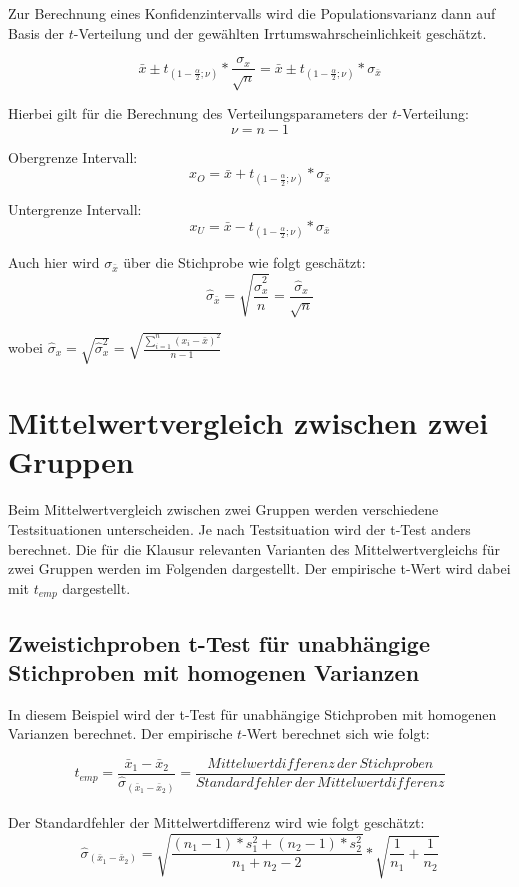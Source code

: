 \documentclass[11pt,a4paper]{article}
\begin{document}
Zur Berechnung eines Konfidenzintervalls wird die Populationsvarianz  dann auf Basis der $t$-Verteilung und der gewählten Irrtumswahrscheinlichkeit geschätzt.
 
$$\bar{x} \pm t_{(1-\frac{\alpha}{2}; \nu)} \ast \frac {\sigma_{x}}{\sqrt{n}} = \bar{x} \pm t_{(1 - \frac{\alpha}{2}; \nu)} * \sigma_{\bar{x}}$$

Hierbei gilt für die Berechnung des Verteilungsparameters der $t$-Verteilung:
$$\nu = n-1 $$

Obergrenze Intervall:\\
$$x_O = \bar{x} + t_{(1-\frac{\alpha}{2}; \nu)} \ast {\sigma_{\bar{x}}}$$

Untergrenze Intervall:\\
$$x_U = \bar{x} - t_{(1-\frac{\alpha}{2}; \nu)} \ast {\sigma_{\bar{x}}}$$

Auch hier wird $\sigma_{\bar{x}}$ über die Stichprobe wie folgt geschätzt: 
$$\hat{\sigma}_{\bar{x}} = \sqrt{ \frac{\hat{\sigma}^2_{x} } {n} } = \frac{\hat{\sigma}_{x}} { \sqrt{n}}$$

wobei $ \hat{\sigma}_x = \sqrt{\hat{\sigma}_x^2} = \sqrt{\frac{ \sum\limits_{i=1}^n (x_{i} - \bar{x})^2} {n-1}} $

\section{Mittelwertvergleich zwischen zwei Gruppen}
Beim Mittelwertvergleich zwischen zwei Gruppen werden verschiedene Testsituationen unterscheiden. Je nach Testsituation wird der t-Test anders berechnet. Die für die Klausur relevanten Varianten des Mittelwertvergleichs für zwei Gruppen werden im Folgenden dargestellt. Der empirische t-Wert wird dabei mit $t_{emp}$ dargestellt. 

\subsection{Zweistichproben t-Test für unabhängige Stichproben mit homogenen Varianzen}
In diesem Beispiel wird der t-Test für unabhängige Stichproben mit homogenen Varianzen berechnet. Der empirische $t$-Wert berechnet sich wie folgt:

$$t_{emp} = \frac{\bar{x}_1 - \bar{x}_2}{\hat{\sigma}_{(\bar{x}_1 - \bar{x}_2)}} = \frac{Mittelwertdifferenz \, der \, Stichproben}{Standardfehler \, der \, Mittelwertdifferenz}$$\\

Der Standardfehler der Mittelwertdifferenz wird wie folgt geschätzt:\\
$$\hat{\sigma}_{(\bar{x}_1 - \bar{x}_2)} = \sqrt{\frac{(n_1 - 1)*s^2_1 + (n_2 - 1)*s^2_2}{n_1 + n_2 -2}} * \sqrt{ \frac{1}{n_1} + \frac{1}{n_2}}$$ \\ 
\end{document}
